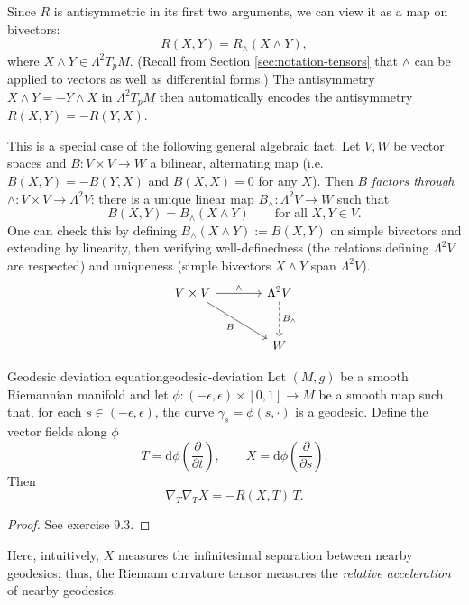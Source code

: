 \begin{colremark}{}
\label{rem:R-map-on-bivectors111}
Since $R$ is antisymmetric in its first two arguments, we can view it as a map on bivectors:
\[
R(X, Y) = R_\wedge(X \wedge Y),
\]
where $X \wedge Y \in \Lambda^2 T_p M$. (Recall from Section \ref{sec:notation-tensors} that $\wedge$ can be applied to vectors as well as differential forms.) The antisymmetry $X \wedge Y = -Y \wedge X$ in $\Lambda^2 T_p M$ then automatically encodes the antisymmetry $R(X, Y) = -R(Y, X)$.

This is a special case of the following general algebraic fact. Let $V,W$ be vector spaces and $B: V \times V \to W$ a bilinear, alternating map (i.e.\ $B(X, Y) = -B(Y, X)$ and $B(X, X) = 0$ for any $X$). Then $B$ \emph{factors through} $\wedge: V\times V\to \Lambda^2 V$: there is a unique linear map $B_\wedge: \Lambda^2 V \to W$ such that
\[
B(X, Y) = B_\wedge(X \wedge Y) \qquad \text{for all } X, Y \in V.
\]
One can check this by defining $B_\wedge(X \wedge Y) := B(X, Y)$ on simple bivectors and extending by linearity, then verifying well-definedness (the relations defining $\Lambda^2 V$ are respected) and uniqueness (simple bivectors $X \wedge Y$ span $\Lambda^2 V$).
\[
\begin{tikzcd}[row sep=large, column sep=large]
V \times V \arrow[r, "\wedge"] \arrow[dr, "B"'] & \Lambda^2 V \arrow[d, dashed, "B_\wedge"] \\
& W
\end{tikzcd}
\]
\end{colremark}

\begin{colorlem}{Geodesic deviation equation}{geodesic-deviation}
Let $(M, g)$ be a smooth Riemannian manifold and let $\phi : (-\epsilon, \epsilon) \times [0, 1] \to M$ be a smooth map such that, for each $s \in (-\epsilon, \epsilon)$, the curve $\gamma_s = \phi(s, \cdot)$ is a geodesic. Define the vector fields along $\phi$
\[
T = \mathrm{d}\phi\!\left(\frac{\partial}{\partial t}\right), \qquad X = \mathrm{d}\phi\!\left(\frac{\partial}{\partial s}\right).
\]
Then
\[
\nabla_T \nabla_T X = -R(X, T)\, T.
\]
\end{colorlem}

\begin{proof}
See exercise 9.3.
\end{proof}

Here, intuitively, $X$ measures the infinitesimal separation between nearby geodesics; thus, the Riemann curvature tensor measures the \emph{relative acceleration} of nearby geodesics.







